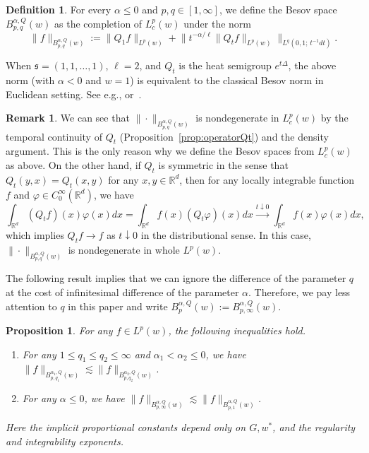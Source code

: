 \documentclass[10pt]{amsart}
\newtheorem{prop}[theo]{Proposition}
\theoremstyle{definition}
\newtheorem{defi}[theo]{Definition}
\newtheorem{rema}[theo]{Remark}
\numberwithin{equation}{section}
\newcommand{\bbR}{\mathbb{R}}
\newcommand{\mfs}{\mathfrak{s}}
\newcommand{\wco}{w^*}
\begin{document}
\begin{defi}
For every $\alpha\le0$ and $p,q\in[1,\infty]$, we define the Besov space $B_{p,q}^{\alpha,Q}(w)$ as the completion of $L_c^p(w)$ under the norm
\[
\|f\|_{B_{p,q}^{\alpha,Q}(w)}:=\|Q_1f\|_{L^p(w)}+\big\|t^{-\alpha/\ell}\|Q_t f\|_{L^p(w)}\big\|_{L^q\left(0,1;\,t^{-1}dt\right)}.
\]
\end{defi}

When $\mfs=(1,1,\dots,1)$, $\ell=2$, and $Q_t$ is the heat semigroup $e^{t\Delta}$, the above norm (with $\alpha<0$ and $w=1$) is equivalent to the classical Besov norm in Euclidean setting. See e.g., \cite[Theorem~2.34]{BCD11} or~\cite[Theorem~2.6.4]{Tri92}.

\begin{rema}\label{QtsymmetricS'}
We can see that $\|\cdot\|_{B_{p,q}^{\alpha,Q}(w)}$ is nondegenerate in $L_c^p(w)$ by the temporal continuity of $Q_t$ (Proposition~\ref{prop:operatorQt}) and the density argument. This is the only reason why we define the Besov spaces from $L_c^p(w)$ as above. On the other hand, if $Q_t$ is symmetric in the sense that $Q_t(y,x)=Q_t(x,y)$ for any $x,y\in\bbR^d$, then for any locally integrable function $f$ and $\varphi\in C_0^\infty(\bbR^d)$, we have
\[
\int_{\bbR^d}(Q_tf)(x)\varphi(x)dx=\int_{\bbR^d}f(x)(Q_t\varphi)(x)dx\xrightarrow{t\downarrow0} \int_{\bbR^d}f(x)\varphi(x)dx,
\]
which implies $Q_tf\to f$ as $t\downarrow0$ in the distributional sense. In this case, $\|\cdot\|_{B_{p,q}^{\alpha,Q}(w)}$ is nondegenerate in whole $L^p(w)$.
\end{rema}

The following result implies that we can ignore the difference of the parameter $q$ at the cost of infinitesimal difference of the parameter $\alpha$. Therefore, we pay less attention to $q$ in this paper and write $B_p^{\alpha,Q}(w):=B_{p,\infty}^{\alpha,Q}(w)$.

\begin{prop}\label{prop:almostequiv}
For any $f\in L^p(w)$, the following inequalities hold.
\begin{enumerate}
\item\label{almostequiv2}
For any $1\le q_1\le q_2\le\infty$ and $\alpha_1<\alpha_2\le0$, we have $\|f\|_{B_{p,q_1}^{\alpha_1,Q}(w)}\lesssim\|f\|_{B_{p,q_2}^{\alpha_2,Q}(w)}$.
\item\label{almostequiv3}
For any $\alpha\le0$, we have $\|f\|_{B_{p,\infty}^{\alpha,Q}(w)}\lesssim\|f\|_{B_{p,1}^{\alpha,Q}(w)}$.
\end{enumerate}
Here the implicit proportional constants depend only on $G,\wco$, and the regularity and integrability exponents.
\end{prop}
\end{document}
